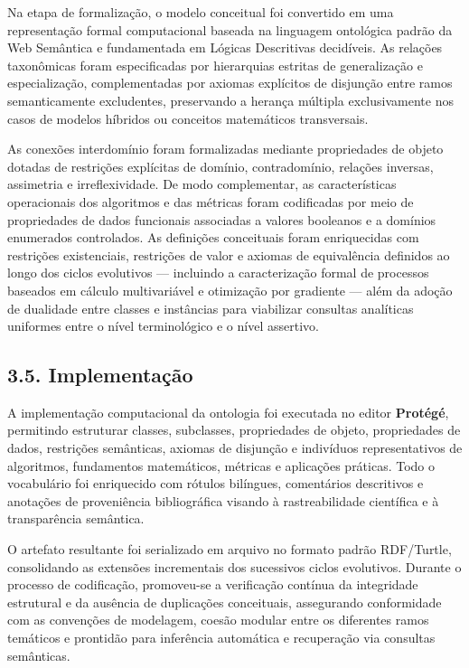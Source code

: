 \documentclass[11pt,a4paper]{article}
\begin{document}
Na etapa de formalização, o modelo conceitual foi convertido em uma representação formal computacional baseada na linguagem ontológica padrão da Web Semântica e fundamentada em Lógicas Descritivas decidíveis. As relações taxonômicas foram especificadas por hierarquias estritas de generalização e especialização, complementadas por axiomas explícitos de disjunção entre ramos semanticamente excludentes, preservando a herança múltipla exclusivamente nos casos de modelos híbridos ou conceitos matemáticos transversais.

As conexões interdomínio foram formalizadas mediante propriedades de objeto dotadas de restrições explícitas de domínio, contradomínio, relações inversas, assimetria e irreflexividade. De modo complementar, as características operacionais dos algoritmos e das métricas foram codificadas por meio de propriedades de dados funcionais associadas a valores booleanos e a domínios enumerados controlados. As definições conceituais foram enriquecidas com restrições existenciais, restrições de valor e axiomas de equivalência definidos ao longo dos ciclos evolutivos --- incluindo a caracterização formal de processos baseados em cálculo multivariável e otimização por gradiente --- além da adoção de dualidade entre classes e instâncias para viabilizar consultas analíticas uniformes entre o nível terminológico e o nível assertivo.

\subsection{3.5. Implementação}

A implementação computacional da ontologia foi executada no editor \textbf{Protégé}, permitindo estruturar classes, subclasses, propriedades de objeto, propriedades de dados, restrições semânticas, axiomas de disjunção e indivíduos representativos de algoritmos, fundamentos matemáticos, métricas e aplicações práticas. Todo o vocabulário foi enriquecido com rótulos bilíngues, comentários descritivos e anotações de proveniência bibliográfica visando à rastreabilidade científica e à transparência semântica.

O artefato resultante foi serializado em arquivo no formato padrão RDF/Turtle, consolidando as extensões incrementais dos sucessivos ciclos evolutivos. Durante o processo de codificação, promoveu-se a verificação contínua da integridade estrutural e da ausência de duplicações conceituais, assegurando conformidade com as convenções de modelagem, coesão modular entre os diferentes ramos temáticos e prontidão para inferência automática e recuperação via consultas semânticas.
\end{document}
